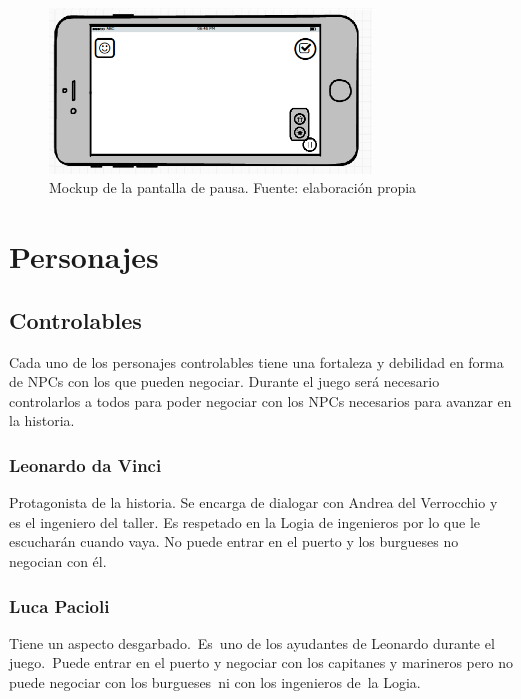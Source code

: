 \begin{figure}
    \begin{center}
 \includegraphics[width=3.36029in,height=1.72756in]{anexos/GDD/GDD-img009.png} 
    \caption{Mockup de la pantalla de pausa. Fuente: elaboración propia}
    \label{mockupPausa}
    \end{center}

\end{figure}


\section[Personajes]{ Personajes}
\label{personajes}
\hypertarget{Toc484614224}{}\subsection[Controlables]{ Controlables}
\hypertarget{Toc484614225}{}{
Cada uno de los personajes controlables tiene una fortaleza y debilidad en forma de NPCs con los que pueden negociar.
Durante el juego ser\'a necesario controlarlos a todos para poder negociar con los NPCs necesarios para avanzar en la
historia.}

\subsubsection[Leonardo da Vinci]{ Leonardo da Vinci}
\hypertarget{Toc484614226}{}{
Protagonista de la historia. Se encarga de dialogar con Andrea del Verrocchio y es el ingeniero del taller. Es respetado
en la Logia de ingenieros por lo que le escuchar\'an cuando vaya. No puede entrar en el puerto y los burgueses no
negocian con \'el.}

\subsubsection[Luca Pacioli]{ Luca Pacioli}
\hypertarget{Toc484614227}{}{
Tiene un aspecto desgarbado.\ Es\ uno de los ayudantes de Leonardo durante el juego.\ Puede entrar en el puerto y
negociar con los capitanes y marineros pero no puede negociar con los burgueses\ ni con los ingenieros de\ la Logia.}

